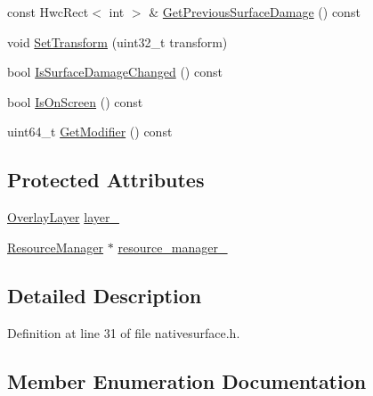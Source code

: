 \begin{DoxyCompactItemize}
\item 
const Hwc\+Rect$<$ int $>$ \& \mbox{\hyperlink{classhwcomposer_1_1NativeSurface_a16a0986ac3a561ad37569b58e5e6458c}{Get\+Previous\+Surface\+Damage}} () const
\item 
void \mbox{\hyperlink{classhwcomposer_1_1NativeSurface_a7f123d6ace53db320cfb78cdb65a82b5}{Set\+Transform}} (uint32\+\_\+t transform)
\item 
bool \mbox{\hyperlink{classhwcomposer_1_1NativeSurface_aade46fbf22c8eb3bdb7edccdf2257423}{Is\+Surface\+Damage\+Changed}} () const
\item 
bool \mbox{\hyperlink{classhwcomposer_1_1NativeSurface_a852d42c61250c745ba92b486cf47e98f}{Is\+On\+Screen}} () const
\item 
uint64\+\_\+t \mbox{\hyperlink{classhwcomposer_1_1NativeSurface_adc54d2c153bc3b9a07620d51105ca85f}{Get\+Modifier}} () const
\end{DoxyCompactItemize}
\subsection*{Protected Attributes}
\begin{DoxyCompactItemize}
\item 
\mbox{\hyperlink{structhwcomposer_1_1OverlayLayer}{Overlay\+Layer}} \mbox{\hyperlink{classhwcomposer_1_1NativeSurface_a4e045387083e61724dbccf9a03df6c4f}{layer\+\_\+}}
\item 
\mbox{\hyperlink{classhwcomposer_1_1ResourceManager}{Resource\+Manager}} $\ast$ \mbox{\hyperlink{classhwcomposer_1_1NativeSurface_afcf0d94e1da86afddd75e62df22a0753}{resource\+\_\+manager\+\_\+}}
\end{DoxyCompactItemize}


\subsection{Detailed Description}


Definition at line 31 of file nativesurface.\+h.



\subsection{Member Enumeration Documentation}
\mbox{\label{classhwcomposer_1_1NativeSurface_a0d0f955fc1e9f95c9684e9524f4217d6}} 
